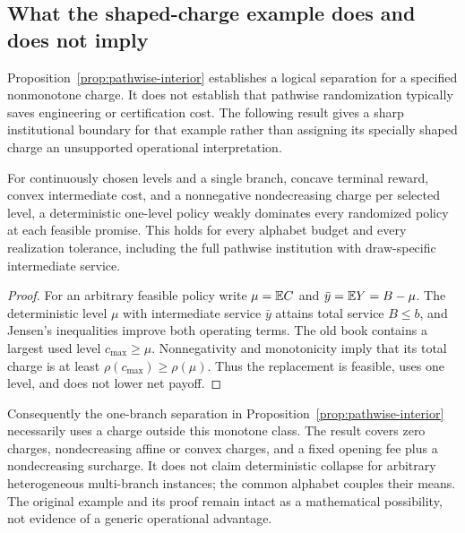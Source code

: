 \subsection{What the shaped-charge example does and does not imply}
Proposition~\ref{prop:pathwise-interior} establishes a logical separation for a specified nonmonotone charge. It does not establish that pathwise randomization typically saves engineering or certification cost. The following result gives a sharp institutional boundary for that example rather than assigning its specially shaped charge an unsupported operational interpretation.
\begin{proposition}\label{prop:r43-monotone}
For continuously chosen levels and a single branch, concave terminal reward, convex intermediate cost, and a nonnegative nondecreasing charge per selected level, a deterministic one-level policy weakly dominates every randomized policy at each feasible promise. This holds for every alphabet budget and every realization tolerance, including the full pathwise institution with draw-specific intermediate service.
\end{proposition}
\begin{proof}
For an arbitrary feasible policy write $\mu=\mathbb E C$ and $\bar y=\mathbb E Y=B-\mu$. The deterministic level $\mu$ with intermediate service $\bar y$ attains total service $B\leq b$, and Jensen's inequalities improve both operating terms. The old book contains a largest used level $c_{\max}\geq\mu$. Nonnegativity and monotonicity imply that its total charge is at least $\rho(c_{\max})\geq\rho(\mu)$. Thus the replacement is feasible, uses one level, and does not lower net payoff.
\end{proof}
Consequently the one-branch separation in Proposition~\ref{prop:pathwise-interior} necessarily uses a charge outside this monotone class. The result covers zero charges, nondecreasing affine or convex charges, and a fixed opening fee plus a nondecreasing surcharge. It does not claim deterministic collapse for arbitrary heterogeneous multi-branch instances; the common alphabet couples their means. The original example and its proof remain intact as a mathematical possibility, not evidence of a generic operational advantage.
